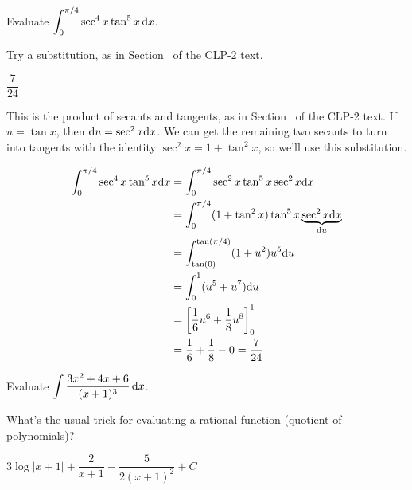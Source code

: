 \begin{question} Evaluate
$\displaystyle\int_0^{\pi/4} \sec^4x\tan^5x\,\mathrm{d}x$.
\end{question}

\begin{hint}
Try a substitution, as in Section~ of the CLP-2 text.%
\end{hint}

\begin{answer}
$\dfrac{7}{24}$
\end{answer}

\begin{solution}

This is the product of secants and tangents, as in Section~
of the CLP-2 text. %
 If $u=\tan x$, then $\mathrm{d}u=\sec^2x\mathrm{d}x$. We can get the remaining two secants to turn into tangents with the identity $\sec^2x=1+\tan^2x$, so we'll use this substitution.

\begin{align*}
\int_{0}^{\pi/4} \sec^4x\tan^5x\mathrm{d}x&=
\int_{0}^{\pi/4} \sec^2x\tan^5x\sec^2x\mathrm{d}x\\
&=
\int_{0}^{\pi/4} (1+\tan^2x)\tan^5x\underbrace{\sec^2x\mathrm{d}x}_{\mathrm{d}u}
\\
&=
\int_{\tan(0)}^{\tan(\pi/4)} (1+u^2)u^5\mathrm{d}u
\\
&=
\int_{0}^{1} (u^5+u^7)\mathrm{d}u
\\
&=
\left[\frac{1}{6}u^6+\frac{1}{8}u^8\right]_{0}^{1}
\\
&=\frac{1}{6}+\frac{1}{8}-0=\frac{7}{24}
\end{align*}
\end{solution}







\begin{question} Evaluate
$\displaystyle\int \frac{3x^2+4x+6}{(x+1)^3} \, \mathrm{d}x$.
\end{question}

\begin{hint}
What's the usual trick for evaluating a rational function (quotient of polynomials)?
\end{hint}

\begin{answer}
$3\log|x+1|+\dfrac{2}{x+1}-\dfrac{5}{2(x+1)^2}+C$
\end{answer}

